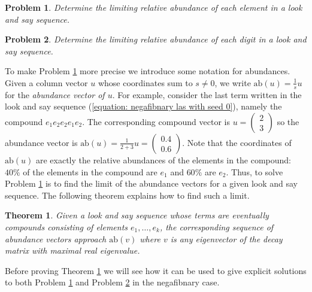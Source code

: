 \documentclass[reqno]{amsart}
\newtheorem{theorem}{Theorem}[section]
\newtheorem{problem}{Problem}
\theoremstyle{definition}
\newcommand{\ab}{\text{ab}}
\begin{document}
\begin{problem}\label{abundance of elements}
    Determine the limiting relative abundance of each element in a look and say sequence.
\end{problem}

\begin{problem}\label{abundance of digits}
    Determine the limiting relative abundance of each digit in a look and say sequence.
\end{problem}

To make Problem \ref{abundance of elements} more precise we introduce some notation for abundances. Given a column vector $u$ whose coordinates sum to $s\not=0$, we write $\ab(u)=\frac{1}{s}u$ for the \emph{abundance vector of $u$}. For example, consider the last term written in the look and say sequence (\ref{equation: negafibnary las with seed 0}), namely the compound $e_1e_2e_2e_1e_2$. The corresponding compound vector is 
$u=\begin{pmatrix}
    2 \\
    3
\end{pmatrix}$
so the abundance vector is
$\ab(u)=\frac{1}{2+3}u=\begin{pmatrix}
    0.4 \\
    0.6
\end{pmatrix}$.
Note that the coordinates of $\ab(u)$ are exactly the relative abundances of the elements in the compound: $40\%$ of the elements in the compound are $e_1$ and $60\%$ are $e_2$.  Thus, to solve Problem \ref{abundance of elements} is to find the limit of the abundance vectors for a given look and say sequence. The following theorem explains how to find such a limit. 

\begin{theorem}\label{theorem:: abundance of elements approach max eigenvector}
Given a look and say sequence whose terms are eventually compounds consisting of elements $e_1,\ldots,e_k$, the corresponding sequence of abundance vectors approach $\ab(v)$ where $v$ is any eigenvector of the decay matrix with maximal real eigenvalue. 
\end{theorem}

Before proving Theorem \ref{theorem:: abundance of elements approach max eigenvector} we will see how it can be used to give explicit solutions to both Problem \ref{abundance of elements} and Problem \ref{abundance of digits} in the negafibnary case. 
\end{document}
